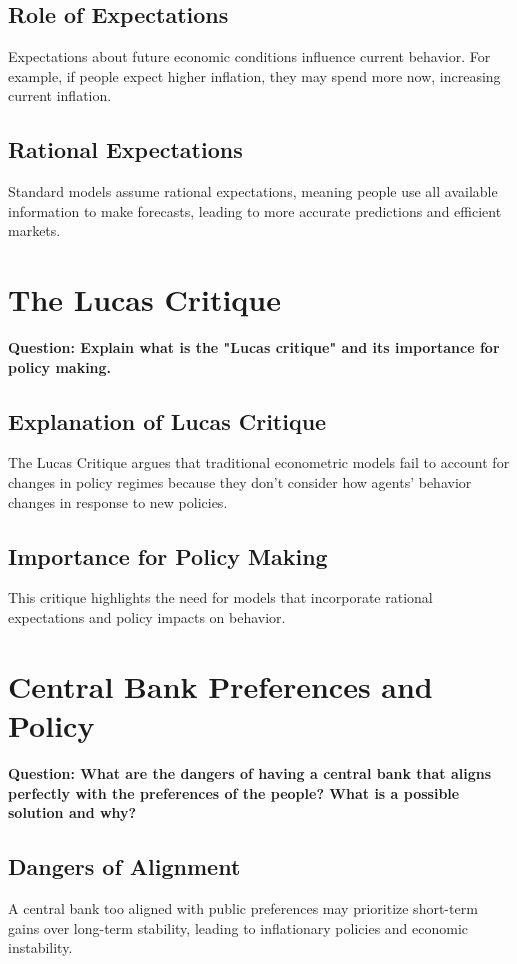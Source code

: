 \documentclass{article}
\begin{document}
\subsection{Role of Expectations}
Expectations about future economic conditions influence current behavior. For example, if people expect higher inflation, they may spend more now, increasing current inflation.

\subsection{Rational Expectations}
Standard models assume rational expectations, meaning people use all available information to make forecasts, leading to more accurate predictions and efficient markets.

\section{The Lucas Critique}
\textbf{Question: Explain what is the "Lucas critique" and its importance for policy making.}

\subsection{Explanation of Lucas Critique}
The Lucas Critique argues that traditional econometric models fail to account for changes in policy regimes because they don't consider how agents' behavior changes in response to new policies.

\subsection{Importance for Policy Making}
This critique highlights the need for models that incorporate rational expectations and policy impacts on behavior.

\section{Central Bank Preferences and Policy}
\textbf{Question: What are the dangers of having a central bank that aligns perfectly with the preferences of the people? What is a possible solution and why?}

\subsection{Dangers of Alignment}
A central bank too aligned with public preferences may prioritize short-term gains over long-term stability, leading to inflationary policies and economic instability.
\end{document}
